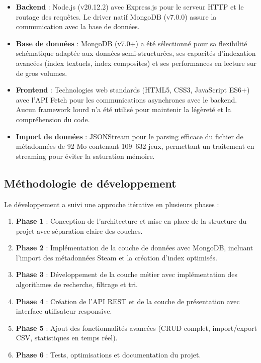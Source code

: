 \begin{itemize}
    \item \textbf{Backend} : Node.js (v20.12.2) avec Express.js pour le serveur HTTP et le routage des requêtes. Le driver natif MongoDB (v7.0.0) assure la communication avec la base de données.
    
    \item \textbf{Base de données} : MongoDB (v7.0+) a été sélectionné pour sa flexibilité schématique adaptée aux données semi-structurées, ses capacités d'indexation avancées (index textuels, index composites) et ses performances en lecture sur de gros volumes.
    
    \item \textbf{Frontend} : Technologies web standards (HTML5, CSS3, JavaScript ES6+) avec l'API Fetch pour les communications asynchrones avec le backend. Aucun framework lourd n'a été utilisé pour maintenir la légèreté et la compréhension du code.
    
    \item \textbf{Import de données} : JSONStream pour le parsing efficace du fichier de métadonnées de 92 Mo contenant 109~632 jeux, permettant un traitement en streaming pour éviter la saturation mémoire.
\end{itemize}

\subsection{Méthodologie de développement}
\label{sec:intro_methodology}

Le développement a suivi une approche itérative en plusieurs phases :

\begin{enumerate}
    \item \textbf{Phase 1} : Conception de l'architecture et mise en place de la structure du projet avec séparation claire des couches.
    
    \item \textbf{Phase 2} : Implémentation de la couche de données avec MongoDB, incluant l'import des métadonnées Steam et la création d'index optimisés.
    
    \item \textbf{Phase 3} : Développement de la couche métier avec implémentation des algorithmes de recherche, filtrage et tri.
    
    \item \textbf{Phase 4} : Création de l'API REST et de la couche de présentation avec interface utilisateur responsive.
    
    \item \textbf{Phase 5} : Ajout des fonctionnalités avancées (CRUD complet, import/export CSV, statistiques en temps réel).
    
    \item \textbf{Phase 6} : Tests, optimisations et documentation du projet.
\end{enumerate}

